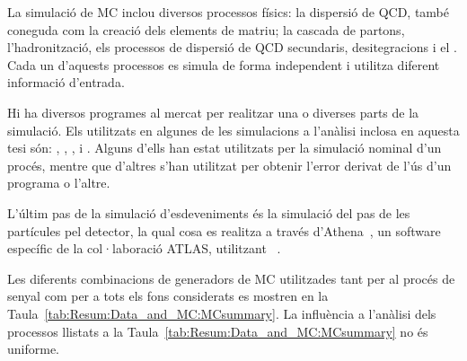La simulació de MC inclou diversos processos físics: la dispersió de QCD, també coneguda 
com la creació dels elements de matriu; la cascada de partons, l'hadronització, els processos 
de dispersió de QCD secundaris, desitegracions i el . Cada un d'aquests processos 
es simula de forma independent i utilitza diferent informació d'entrada.

Hi ha diversos programes al mercat per realitzar una o diverses parts de la simulació. 
Els utilitzats en algunes de les simulacions a l'anàlisi inclosa en aquesta tesi són: 
\POWHEGBOX, \MGNLO, \SHERPA, \PYTHIA  i \HERWIG. Alguns d'ells han 
estat utilitzats per la simulació nominal d'un procés, mentre que d'altres s'han
utilitzat per obtenir l'error derivat de l'ús d'un programa o l'altre.

L'últim pas de la simulació d'esdeveniments és la simulació del pas de les partícules pel detector, 
la qual cosa es realitza a través d'Athena~\cite{Duckeck:2005rb, Mato:1998gfa}, 
un software específic de la col·laboració ATLAS, utilitzant \GEANT~\cite{GEANT4:2002zbu}.


Les diferents combinacions de generadors de MC utilitzades tant per 
al procés de senyal com per a tots els fons considerats es mostren 
en la Taula~\ref{tab:Resum:Data_and_MC:MCsummary}. La influència a l'anàlisi
dels processos llistats a la Taula~\ref{tab:Resum:Data_and_MC:MCsummary}
no és uniforme.

